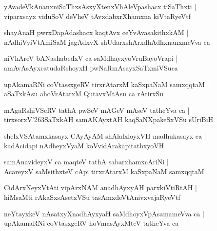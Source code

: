 \documentclass[twoside,12pt,openright]{book}
\def\S{\char'263}
\newcounter{shloka}[chapter]
\begin{document}
\begin{shloka}
yAvadeVkAnanxniSaThxsAsxyXtenxVhAleVpashacx tiSaThxti |\\
viparxsayx viduSoV deVheV tAvxdabxrXhamxna kiVtaRyeVtf 
\end{shloka}

\begin{shloka}
shayAnaH pwrxDapAdashacx kaqtAvx ceYvAvasakithxkAM |\\
nAdhiVyiVtAmiSaM jagAdxvX shUdarxshArxdhAdhxnanxmeVva ca
\end{shloka}

\begin{shloka}
niVhAreV bANashabedxV ca saMdhayxyoVruBayoVrapi |\\
amAvAsAyxcatudaRshoyxH pwNaRmAsayxSaTxmiVSuca 
\end{shloka}

\begin{shloka}
upAkamaRNi coVtassxgeRV tirxrAtarxM kaSxpaNaM samxqqtaM |\\
aSaTxkAsu ahoVrAtarxM  QutavxMtAsu ca rAtirxSu
\end{shloka}

\begin{shloka}
mAgaRshiVSeRV tathA pwSeV mAGeV mAseV tatheYva ca |\\
tirxsorxV\S SaTxkAH samAKAyxtAH kaqSaNXpakeSxVSu sUriBiH 
\end{shloka}

\begin{shloka}
shelxVSAtamxkasayx CAyAyAM shAlalxloyxVH  madhukasayx ca |\\
kadAcidapi nAdheyxVyaM koVvidArakapitathxyoVH 
\end{shloka}

\begin{shloka}
samAnavideyxV ca maqteV tathA sabarxhamxcAriNi |\\
AcareyxV saMsithxteV cApi tirxrAtarxM kaSxpaNaM samxqqtaM 
\end{shloka}

\begin{shloka}
CidArxNeyxVtAti vipArxNAM anadhAyxyAH parxkiVtiRtAH |\\
hiMsaMti rAkaSxsAsetxVSu tasAmxdeVtAnivxvajaRyeVtf 
\end{shloka}

\begin{shloka}
neYtayxkeV nAsatxyXnadhAyxyaH saMdhoyxVpAsamameVva ca |\\
upAkamaRNi coVtasxgeRV hoVmasAyxMteV tatheYva ca 
\end{shloka}
\end{document}
